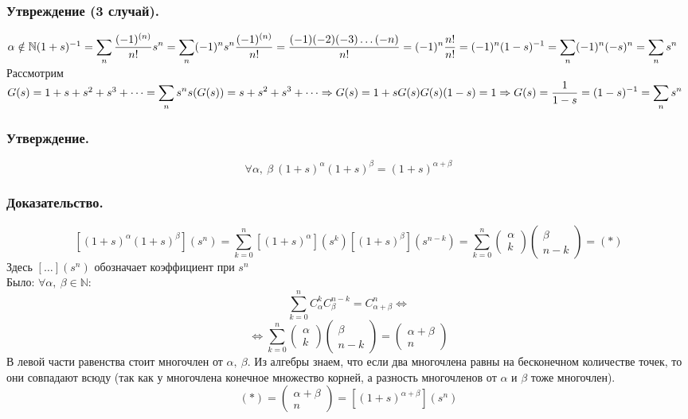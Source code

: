 \documentclass[12pt, letterpaper, twoside]{article}
\newcommand{\DS}{\displaystyle}
\newcommand{\mb}[1]{\mathbb{#1}}
\begin{document}
    \subsubsection*{Утвреждение (3 случай).}
    $\alpha \notin \mb{N}\\
    (1 + s)^{-1} = \DS\sum_{n} \frac{(-1)^{(n)}}{n!} s^n = \sum_{n}(-1)^n s^n\\
    \dfrac{ (-1)^{(n)} }{n!} = \dfrac{(-1)(-2)(-3)\dots (-n)}{n!} = (-1)^n \dfrac{n!}{n!} = (-1)^n\\
    (1 - s)^{-1} = \sum_{n}(-1)^n (-s)^n = \sum_{n} s^n$\\
    Рассмотрим $G(s) = 1 + s + s^2 + s^3 + \dots = \DS \sum_n s^n\\
    s(G(s)) = s + s^2 + s^3 + \dots\Rightarrow G(s) = 1 + sG(s)\\
    G(s)(1 - s) = 1\Rightarrow G(s) = \dfrac{1}{1 - s} = (1 - s)^{-1} = \sum_n s^n$
    \subsubsection*{Утверждение.}
    \[\forall \alpha,\ \beta\ (1 + s)^{\alpha} (1 + s)^{\beta} = (1 + s)^{\alpha + \beta}\]
    \subsubsection*{Доказательство.}
    \[\left[ (1 + s)^{\alpha}(1 + s)^{\beta} \right] (s^n) = \sum_{k = 0}^n \left[(1 + s)^{\alpha}\right](s^k)\left[ (1 + s)^{\beta} \right](s^{n - k}) = \sum_{k = 0}^{n} \begin{pmatrix}
        \alpha \\ k
    \end{pmatrix} \begin{pmatrix}
        \beta \\ n - k
    \end{pmatrix} = (*)\]
    Здесь $[\dots](s^n)$ обозначает коэффициент при $s^n$\\
    Было: $\forall \alpha,\ \beta \in \mb{N}$:
    \[\sum_{k =0}^{n} C_{\alpha}^k C^{n - k}_{\beta} = C^n_{\alpha + \beta}\Leftrightarrow\]
    \[\Leftrightarrow \sum_{k = 0}^{n} \begin{pmatrix}
        \alpha \\ k
    \end{pmatrix} \begin{pmatrix}
        \beta \\ n - k
    \end{pmatrix} = \begin{pmatrix}
        \alpha + \beta\\ n
    \end{pmatrix}\]
    В левой части равенства стоит многочлен от $\alpha,\ \beta$. Из алгебры знаем, что если два многочлена равны на бесконечном количестве точек, то они совпадают всюду (так как у многочлена конечное множество корней, а разность многочленов от $\alpha$ и $\beta$ тоже многочлен).
    \[(*) = \begin{pmatrix}
        \alpha + \beta\\
        n
    \end{pmatrix} = \left[ (1 + s)^{\alpha + \beta} \right](s^n)\]
\end{document}
